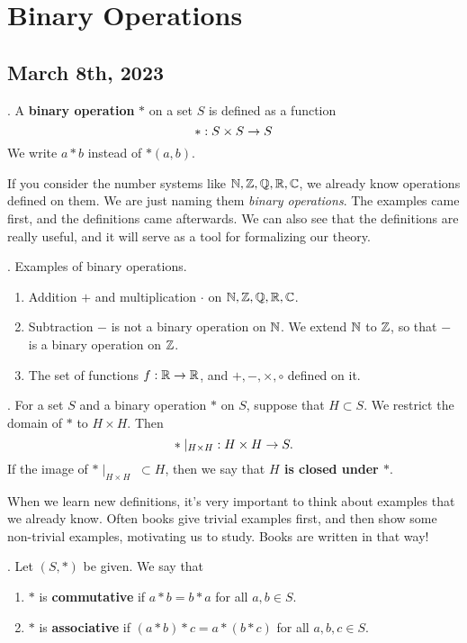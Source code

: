 \chapter{Binary Operations}

\section*{March 8th, 2023}

.  A \textbf{binary operation} \(\ast\) on a set \(S\) is defined as a function
\[
    \ast: S \times S \rightarrow S
\]
We write \(a \ast b\) instead of \(\ast(a, b)\).

\rmk If you consider the number systems like \(\mathbb{N}, \mathbb{Z}, \mathbb{Q}, \mathbb{R}, \mathbb{C}\), we already know operations defined on them. We are just naming them \textit{binary operations}. The examples came first, and the definitions came afterwards. We can also see that the definitions are really useful, and it will serve as a tool for formalizing our theory.

\ex. Examples of binary operations.
\begin{enumerate}
    \item Addition \(+\) and multiplication \(\cdot\) on \(\mathbb{N}, \mathbb{Z}, \mathbb{Q}, \mathbb{R}, \mathbb{C}\).
    \item Subtraction \(-\) is not a binary operation on \(\mathbb{N}\). We extend \(\mathbb{N}\) to \(\mathbb{Z}\), so that \(-\) is a binary operation on \(\mathbb{Z}\).
    \item The set of functions \(f: \mathbb{R} \rightarrow \mathbb{R}\), and \(+, -, \times, \circ\) defined on it.
\end{enumerate}

.  For a set \(S\) and a binary operation \(\ast\) on \(S\), suppose that \(H \subset S\). We restrict the domain of \(\ast\) to \(H \times H\). Then
\[
    \ast\mid_{H\times H} \;: H\times H \rightarrow S.
\]
If the image of \(\ast\mid_{H\times H} \;\subset H\), then we say that \textbf{\(H\) is closed under \(\ast\)}.

\rmk When we learn new definitions, it's very important to think about examples that we already know. Often books give trivial examples first, and then show some non-trivial examples, motivating us to study. Books are written in that way!

. Let \((S, \ast)\) be given. We say that
\begin{enumerate}
    \item \(\ast\) is \textbf{commutative} if \(a \ast b = b \ast a\) for all \(a, b \in S\).
    \item \(\ast\) is \textbf{associative} if \((a \ast b)\ast c = a \ast (b \ast c)\) for all \(a, b, c \in S\).
\end{enumerate}

